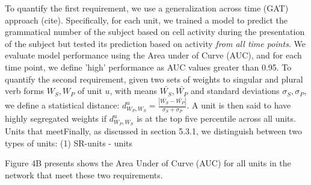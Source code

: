 To quantify the first requirement, we use a generalization across time (GAT) approach (cite). Specifically, for each unit, we trained a model to predict the grammatical number of the subject based on cell activity during the presentation of the subject but tested its prediction based on activity \textit{from all time points}. We evaluate model performance using the Area under of Curve (AUC), and for each time point, we define 'high' performance as AUC values greater than 0.95. To quantify the second requirement, given two sets of weights to singular and plural verb forms $W_S, W_P$ of unit $u$, with means $\bar{W_S}, \bar{W_P}$ and standard deviations $\sigma_S, \sigma_P$, we define a statistical distance: $d^u_{W_P, W_S}=\frac{|\bar{W_S}-\bar{W_P}|}{\sigma_S+\sigma_P}$. A unit is then said to have highly segregated weights if $d^u_{W_P, W_S}$ is at the top five percentile across all units. Units that meetFinally, as discussed in section 5.3.1, we distinguish between two types of units: (1) SR-units - units

Figure 4B presents shows the Area Under of Curve (AUC) for all units in the network that meet these two requirements. 


